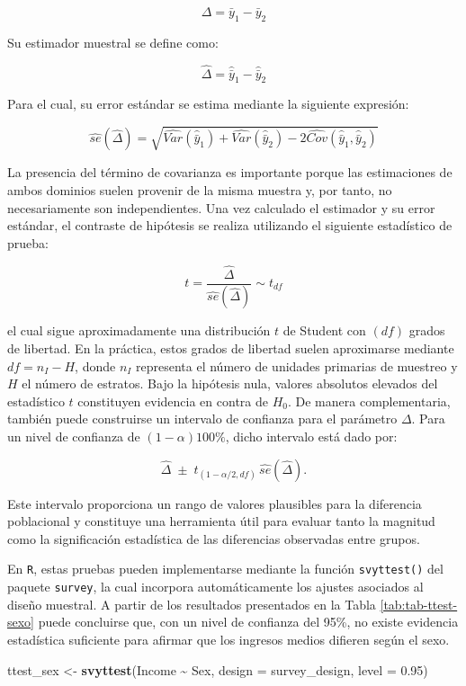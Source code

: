 \documentclass[
  spanish,
  12pt,
]{book}
\newenvironment{Shaded}{\begin{snugshade}}{\end{snugshade}}
\newcommand{\AttributeTok}[1]{\textcolor[rgb]{0.13,0.29,0.53}{#1}}
\newcommand{\FloatTok}[1]{\textcolor[rgb]{0.00,0.00,0.81}{#1}}
\newcommand{\FunctionTok}[1]{\textcolor[rgb]{0.13,0.29,0.53}{\textbf{#1}}}
\newcommand{\NormalTok}[1]{#1}
\newcommand{\OtherTok}[1]{\textcolor[rgb]{0.56,0.35,0.01}{#1}}
\newcommand{\SpecialCharTok}[1]{\textcolor[rgb]{0.81,0.36,0.00}{\textbf{#1}}}
\begin{document}
\[
\Delta = \bar{y}_1 - \bar{y}_2
\]

Su estimador muestral se define como:

\[
\hat{\Delta} = \hat{\bar{y}}_1 - \hat{\bar{y}}_2
\]

Para el cual, su error estándar se estima mediante la siguiente expresión:

\[
\widehat{se}(\hat{\Delta}) =
\sqrt{
\widehat{Var}(\hat{\bar{y}}_1)
+
\widehat{Var}(\hat{\bar{y}}_2)
-
2\widehat{Cov}(\hat{\bar{y}}_1, \hat{\bar{y}}_2)
}
\]

La presencia del término de covarianza es importante porque las estimaciones de ambos dominios suelen provenir de la misma muestra y, por tanto, no necesariamente son independientes. Una vez calculado el estimador y su error estándar, el contraste de hipótesis se realiza utilizando el siguiente estadístico de prueba:

\[
t =
\frac{\hat{\Delta}}
{\widehat{se}(\hat{\Delta})} \sim t_{df}
\]

el cual sigue aproximadamente una distribución \(t\) de Student con \((df)\) grados de libertad. En la práctica, estos grados de libertad suelen aproximarse mediante \(df = n_I - H\), donde \(n_I\) representa el número de unidades primarias de muestreo y \(H\) el número de estratos. Bajo la hipótesis nula, valores absolutos elevados del estadístico \(t\) constituyen evidencia en contra de \(H_0\). De manera complementaria, también puede construirse un intervalo de confianza para el parámetro \(\Delta\). Para un nivel de confianza de \((1-\alpha)100\%\), dicho intervalo está dado por:

\[
\hat{\Delta}
\;\pm\;
t_{(1-\alpha/2,df)}
\,
\hat{se}(\hat{\Delta}).
\]

Este intervalo proporciona un rango de valores plausibles para la diferencia poblacional y constituye una herramienta útil para evaluar tanto la magnitud como la significación estadística de las diferencias observadas entre grupos.

En \texttt{R}, estas pruebas pueden implementarse mediante la función \texttt{svyttest()} del paquete \texttt{survey}, la cual incorpora automáticamente los ajustes asociados al diseño muestral. A partir de los resultados presentados en la Tabla \ref{tab:tab-ttest-sexo} puede concluirse que, con un nivel de confianza del 95\%, no existe evidencia estadística suficiente para afirmar que los ingresos medios difieren según el sexo.

\begin{Shaded}
\begin{Highlighting}[]
\NormalTok{ttest\_sex }\OtherTok{\textless{}{-}} \FunctionTok{svyttest}\NormalTok{(Income }\SpecialCharTok{\textasciitilde{}}\NormalTok{ Sex, }\AttributeTok{design =}\NormalTok{ survey\_design, }\AttributeTok{level =} \FloatTok{0.95}\NormalTok{)}
\end{Highlighting}
\end{Shaded}
\end{document}
